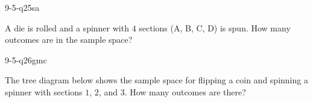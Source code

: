 \begin{practiceQuestion}{9-5-q25}{sa}
\begin{questionText}
A die is rolled and a spinner with $4$ sections (A, B, C, D) is spun. How many outcomes are in the sample space?
\end{questionText}
\end{practiceQuestion}


\begin{practiceQuestion}{9-5-q26}{gmc}
\begin{questionText}
The tree diagram below shows the sample space for flipping a coin and spinning a spinner with sections $1$, $2$, and $3$. How many outcomes are there?

\begin{center}
\end{center}
\end{questionText}
\end{practiceQuestion}

